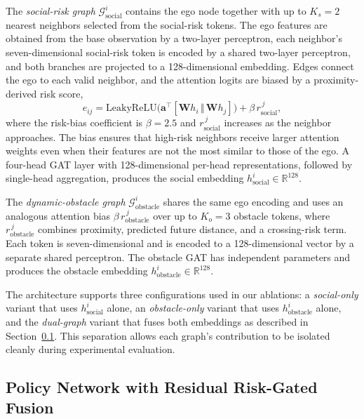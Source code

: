 \documentclass[journal,twoside,web]{ieeecolor}
\begin{document}
The \emph{social-risk graph} $\mathcal{G}_{\text{social}}^i$ contains the ego node together with up to $K_s = 2$ nearest neighbors selected from the social-risk tokens. The ego features are obtained from the base observation by a two-layer perceptron, each neighbor's seven-dimensional social-risk token is encoded by a shared two-layer perceptron, and both branches are projected to a 128-dimensional embedding. Edges connect the ego to each valid neighbor, and the attention logits are biased by a proximity-derived risk score,
\[
e_{ij} = \mathrm{LeakyReLU}\!\bigl(\mathbf{a}^\top[\mathbf{W}h_i\,\Vert\,\mathbf{W}h_j]\bigr) + \beta\, r_{\text{social}}^{\,j},
\]
where the risk-bias coefficient is $\beta = 2.5$ and $r_{\text{social}}^{\,j}$ increases as the neighbor approaches. The bias ensures that high-risk neighbors receive larger attention weights even when their features are not the most similar to those of the ego. A four-head GAT layer with 128-dimensional per-head representations, followed by single-head aggregation, produces the social embedding $h_{\text{social}}^i\in\mathbb{R}^{128}$.

The \emph{dynamic-obstacle graph} $\mathcal{G}_{\text{obstacle}}^i$ shares the same ego encoding and uses an analogous attention bias $\beta\, r_{\text{obstacle}}^{\,j}$ over up to $K_o = 3$ obstacle tokens, where $r_{\text{obstacle}}^{\,j}$ combines proximity, predicted future distance, and a crossing-risk term. Each token is seven-dimensional and is encoded to a 128-dimensional vector by a separate shared perceptron. The obstacle GAT has independent parameters and produces the obstacle embedding $h_{\text{obstacle}}^i\in\mathbb{R}^{128}$.

The architecture supports three configurations used in our ablations: a \emph{social-only} variant that uses $h_{\text{social}}^i$ alone, an \emph{obstacle-only} variant that uses $h_{\text{obstacle}}^i$ alone, and the \emph{dual-graph} variant that fuses both embeddings as described in Section~\ref{sec:policy_arch}. This separation allows each graph's contribution to be isolated cleanly during experimental evaluation.

\subsection{Policy Network with Residual Risk-Gated Fusion}
\label{sec:policy_arch}
\end{document}
